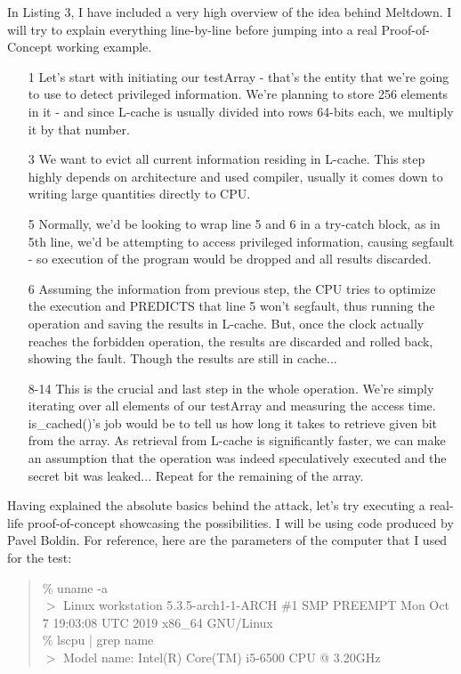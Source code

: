 \documentclass{article}
\begin{document}
In Listing 3, I have included a very high overview of the idea behind Meltdown. I will try to explain everything line-by-line before jumping into a real Proof-of-Concept working example.
\begin{enumerate}

  \item [1] Let's start with initiating our testArray - that's the entity that we're going to use to detect privileged information. We're planning to store 256 elements in it - and since L-cache is usually divided into rows 64-bits each, we multiply it by that number. 
  \item [3] We want to evict all current information residing in L-cache. This step highly depends on architecture and used compiler, usually it comes down to writing large quantities directly to CPU.
  \item [5] Normally, we'd be looking to wrap line 5 and 6 in a try-catch block, as in 5th line, we'd be attempting to access privileged information, causing segfault - so execution of the program would be dropped and all results discarded.
  \item [6] Assuming the information from previous step, the CPU tries to optimize the execution and PREDICTS that line 5 won't segfault, thus running the operation and saving the results in L-cache. But, once the clock actually reaches the forbidden operation, the results are discarded and rolled back, showing the fault. Though the results are still in cache...
  \item [8-14] This is the crucial and last step in the whole operation. We're simply iterating over all elements of our testArray and measuring the access time. is\_cached()'s job would be to tell us how long it takes to retrieve given bit from the array. As retrieval from L-cache is significantly faster, we can make an assumption that the operation was indeed speculatively executed and the secret bit was leaked... Repeat for the remaining of the array.

\end{enumerate}

Having explained the absolute basics behind the attack, let's try executing a real-life proof-of-concept showcasing the possibilities. I will be using code produced by Pavel Boldin\cite{MeltdownPOC}. For reference, here are the parameters of the computer that I used for the test:

\begin{quote}
\% uname -a 
\\ $>$ Linux workstation 5.3.5-arch1-1-ARCH \#1 SMP PREEMPT Mon Oct 7 19:03:08 UTC 2019 x86\_64 GNU/Linux 
\\ \% lscpu | grep name
\\ $>$ Model name: Intel(R) Core(TM) i5-6500 CPU @ 3.20GHz
\end{quote}
\end{document}
